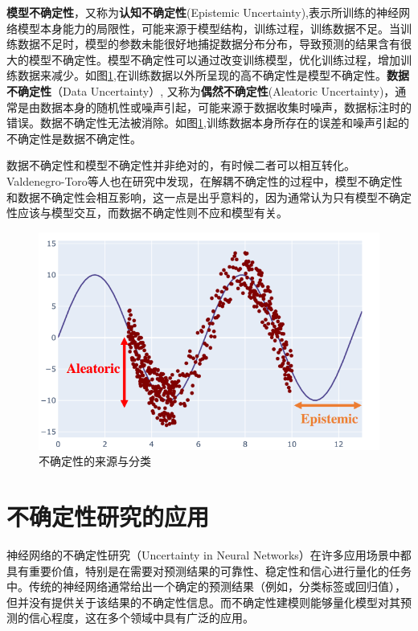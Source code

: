 \textbf{模型不确定性}，又称为\textbf{认知不确定性}(Epistemic Uncertainty),表示所训练的神经网络模型本身能力的局限性，可能来源于模型结构，训练过程，训练数据不足。当训练数据不足时，模型的参数未能很好地捕捉数据分布分布，导致预测的结果含有很大的模型不确定性。模型不确定性可以通过改变训练模型，优化训练过程，增加训练数据来减少。如图\ref{fig:uncertainty},在训练数据以外所呈现的高不确定性是模型不确定性。\textbf{数据不确定性}（Data Uncertainty）, 又称为\textbf{偶然不确定性}(Aleatoric Uncertainty)，通常是由数据本身的随机性或噪声引起，可能来源于数据收集时噪声，数据标注时的错误。数据不确定性无法被消除。如图\ref{fig:uncertainty},训练数据本身所存在的误差和噪声引起的不确定性是数据不确定性。

数据不确定性和模型不确定性并非绝对的，有时候二者可以相互转化\cite{hullermeier2021aleatoric}。Valdenegro-Toro等人\cite{valdenegro2022deeper}也在研究中发现，在解耦不确定性的过程中，模型不确定性和数据不确定性会相互影响，这一点是出乎意料的，因为通常认为只有模型不确定性应该与模型交互，而数据不确定性则不应和模型有关。

\begin{figure}[H]
    \centering
    \includegraphics[width=0.9\linewidth]{assets/1-1.png}
    \caption{不确定性的来源与分类\cite{abdar2021review}
}
    \label{fig:uncertainty}
\end{figure}

\section{不确定性研究的应用}
神经网络的不确定性研究（Uncertainty in Neural Networks）在许多应用场景中都具有重要价值，特别是在需要对预测结果的可靠性、稳定性和信心进行量化的任务中。传统的神经网络通常给出一个确定的预测结果（例如，分类标签或回归值），但并没有提供关于该结果的不确定性信息。而不确定性建模则能够量化模型对其预测的信心程度，这在多个领域中具有广泛的应用。

